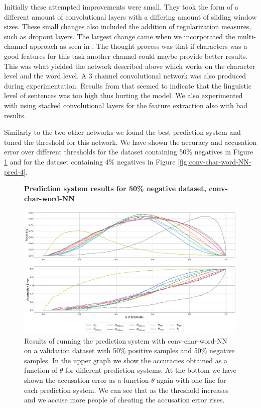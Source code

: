 Initially these attempted improvements were small. They took the form of a
different amount of convolutional layers with a differing amount of sliding
window sizes. These small changes also included the addition of regularization
measures, such as dropout layers. The largest change came when we incorporated
the multi-channel approach as seen in \cite{DBLP:journals/corr/RuderGB16c}. The
thought process was that if characters was a good features for this task another
channel could maybe provide better results. This was what yielded the network
described above which works on the character level and the word level. A 3
channel convolutional network was also produced during experimentation. Results
from that seemed to indicate that the linguistic level of sentences was too high
thus hurting the model. We also experimented with using stacked convolutional
layers for the feature extraction also with bad results.

Similarly to the two other networks we found the best prediction system and
tuned the threshold for this network. We have shown the accuracy and accusation
error over different thresholds for the dataset containing 50\% negatives in
Figure \ref{fig:conv-char-word-NN-pred-50} and for the dataset containing 4\%
negatives in Figure \ref{fig:conv-char-word-NN-pred-4}.

\begin{figure}
    \centering
    \textbf{Prediction system results for 50\% negative dataset, \gls{conv-char-word-NN}}\par\medskip
    \includegraphics[scale=0.33]{./pictures/experiments/conv_char_word_nn/prediction_system_50}
    \caption{Results of running the prediction system with
        \gls{conv-char-word-NN} on a validation dataset with 50\% positive
        samples and 50\% negative samples. In the upper graph we show the
        accuracies obtained as a function of $\theta$ for different prediction
        systems. At the bottom we have shown the accusation error as a function
        $\theta$ again with one line for each prediction system. We can see that
        as the threshold increases and we accuse more people of cheating the
        accusation error rises.}
    \label{fig:conv-char-word-NN-pred-50}
\end{figure}

